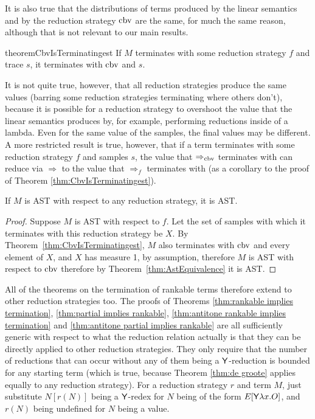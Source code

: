 It is also true that the distributions of terms produced by the linear semantics and by the reduction strategy $\operatorname{cbv}$ are the same, for much the same reason, although that is not relevant to our main results.

\begin{restatable}{theorem}{CbvIsTerminatingest} \label{thm:CbvIsTerminatingest}
If $M$ terminates with some reduction strategy $f$ and trace $s$, it terminates with $\operatorname{cbv}$ and $s$.
\end{restatable}

It is not quite true, however, that all reduction strategies produce the same values (barring some reduction strategies terminating where others don't), because it is possible for a reduction strategy to overshoot the value that the linear semantics produces by, for example, performing reductions inside of a lambda. Even for the same value of the samples, the final values may be different. A more restricted result is true, however, that if a term terminates with some reduction strategy $f$ and samples $s$, the value that $\Rightarrow_{\operatorname{cbv}}$ terminates with can reduce via $\Rightarrow$ to the value that $\Rightarrow_f$ terminates with (as a corollary to the proof of Theorem \ref{thm:CbvIsTerminatingest}).

\begin{corollary}
If $M$ is AST with respect to any reduction strategy, it is AST.
\end{corollary}
\begin{proof}
Suppose $M$ is AST with respect to $f$. Let the set of samples with which it terminates with this reduction strategy be $X$. By Theorem~\ref{thm:CbvIsTerminatingest}, $M$ also terminates with $\operatorname{cbv}$ and every element of $X$, and $X$ has measure 1, by assumption, therefore $M$ is AST with respect to $\operatorname{cbv}$ therefore by Theorem~\ref{thm:AstEquivalence} it is AST.
\end{proof}

All of the theorems on the termination of rankable terms therefore extend to other reduction strategies too. The proofs of Theorems \ref{thm:rankable implies termination}, \ref{thm:partial implies rankable}, \ref{thm:antitone rankable implies termination} and \ref{thm:antitone partial implies rankable} are all sufficiently generic with respect to what the reduction relation actually is that they can be directly applied to other reduction strategies. They only require that the number of reductions that can occur without any of them being a $\mathsf{Y}$-reduction is bounded for any starting term (which is true, because Theorem \ref{thm:de groote} applies equally to any reduction strategy). For a reduction strategy $r$ and term $M$, just substitute $N[r(N)]$ being a $\mathsf{Y}$-redex for $N$ being of the form $E[\mathsf{Y} \lambda x. O]$, and $r(N)$ being undefined for $N$ being a value.

